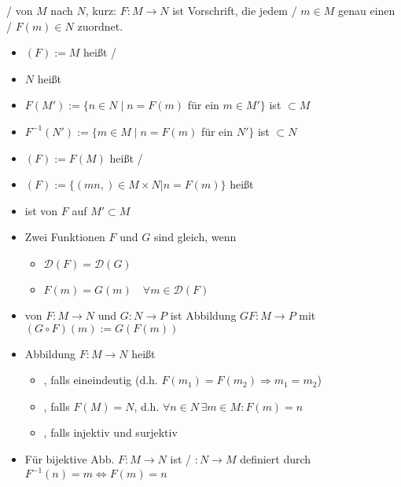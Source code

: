 \begin{*definition}[Abbildung]
	/ von $M$ nach $N$, kurz: $F:M\rightarrow N$ ist Vorschrift, die jedem  /  $m\in M$ genau einen  /  $F(m)\in N$ zuordnet.
	
	\begin{itemize}
		\item {}$(F):=M$ heißt  / 
		\item $N$ heißt 
		\item $F(M'):=\{n\in N \mid n=F(m)$ für ein $m\in M'\}$ ist $\subset M$
		\item $F^{-1}(N'):=\{ m\in M\mid n=F(m)$ für ein $N' \}$ ist $\subset N$
		\item {}$(F):= F(M)$ heißt  / 
		\item {}$(F) :=\{ (mn,)\in M\times N | n = F(m)\}$ heißt 
		\item {} ist  von $F$ auf $M'\subset M$
		\item Zwei Funktionen $F$ und $G$ sind gleich, wenn
		\begin{itemize}
			\item $\mathcal{D}(F)=\mathcal{D}(G)$
			\item $F(m)=G(m)\quad\forall m\in\mathcal{D}(F)$
		\end{itemize}
		\item {} von $F:M\rightarrow N$ und $G:N\rightarrow P$ ist Abbildung $G$$F:M\rightarrow P$ mit $(G\circ F)(m):=G(F(m))$
		\item Abbildung $F:M\rightarrow N$ heißt
		\begin{itemize}
			\item {}, falls eineindeutig (d.h. $F(m_1) = F(m_2) \Rightarrow m_1 = m_2$)
			\item {}, falls $F(M) = N$, d.h. $\forall n\in N\,\exists m\in M: F(m) = n$
			\item {}, falls injektiv und surjektiv
		\end{itemize}
		\item Für bijektive Abb. $F:M\rightarrow N$ ist  /  $:N\rightarrow M$ definiert durch $F^{-1}(n) = m \Leftrightarrow F(m) = n$
	\end{itemize}
\end{*definition}

